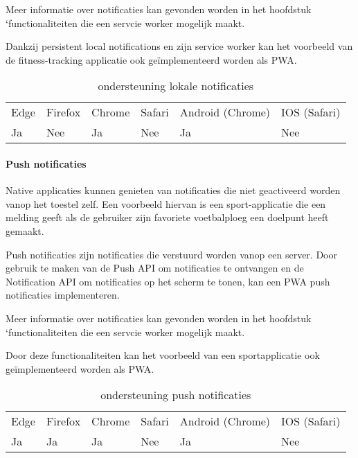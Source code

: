 Meer informatie over notificaties kan gevonden worden in het hoofdstuk ‘functionaliteiten die een servcie worker mogelijk maakt.

Dankzij persistent local notifications en zijn service worker kan het voorbeeld van de fitness-tracking applicatie ook geïmplementeerd worden als PWA.

\begin{table}[]
	\begin{tabular}{llllll}
		Edge & Firefox & Chrome & Safari & Android (Chrome) & IOS (Safari) \\
		Ja   & Nee      &  Ja     & Nee     & Ja               & Nee          
	\end{tabular}	
	\caption{ondersteuning lokale notificaties }
	\label{ondersteuning lokale notificaties}
\end{table}

\paragraph{Push notificaties}

Native applicaties kunnen genieten van notificaties die niet geactiveerd worden vanop het toestel zelf. Een voorbeeld hiervan is een sport-applicatie die een melding geeft als de gebruiker zijn favoriete voetbalploeg een doelpunt heeft gemaakt.

Push notificaties zijn notificaties die verstuurd worden vanop een server. Door gebruik te maken van de Push API \autocite{Sullivan2020} om notificaties te ontvangen en de Notification API om notificaties op het scherm te tonen, kan een PWA push notificaties implementeren. 

Meer informatie over notificaties kan gevonden worden in het hoofdstuk ‘functionaliteiten die een servcie worker mogelijk maakt.

Door deze functionaliteiten kan het voorbeeld van een sportapplicatie ook geïmplementeerd worden als PWA.

\begin{table}[]
	\begin{tabular}{llllll}
		Edge & Firefox & Chrome & Safari & Android (Chrome) & IOS (Safari) \\
		Ja   & Ja      &  Ja     & Nee     & Ja               & Nee          
	\end{tabular}	
	\caption{ondersteuning push notificaties }
	\label{ondersteuning push notificaties}
\end{table}



